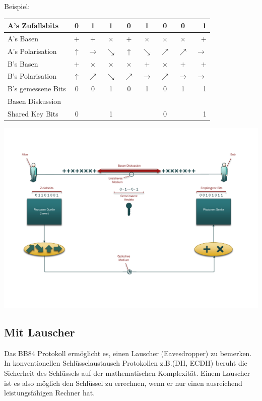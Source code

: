   Beispiel:
  \begin{center}
    \begin{tabular}{ l || c | c | c | c | c | c | c | r }
      \hline
      A's Zufallsbits & 0 &  1 & 1 & 0 & 1 & 0 & 0 & 1 \\
      \hline
      A's Basen & $+$ & $+$ & $\times $ & $+$ & $\times $ & $\times $ & $\times $ & $+$ \\
      \hline
      A's Polarisation & $\uparrow$ & $\rightarrow$ & $\searrow$ & $\uparrow$ & $\searrow$ & $\nearrow$ & $\nearrow$ & $\rightarrow$ \\
      \hline
      B's Basen & $+$ & $\times $ & $\times $ & $\times $ & $+$ & $\times $ & $+$ & $+$ \\
      \hline
      B's Polarisation & $\uparrow$ & $\nearrow$ & $\searrow$ & $\nearrow$ & $\rightarrow$ & $\nearrow$ & $\rightarrow$ & $\rightarrow$ \\
      \hline
      B's gemessene Bits & 0 & 0 & 1 & 0 & 1 & 0 & 1 & 1 \\
      \hline
      Basen Diskussion \\
      \hline
      Shared Key Bits& 0 & & 1 & & & 0 & & 1 \\
      \hline
    \end{tabular}
  \end{center}

  \includegraphics[width=\textwidth]{crypto/BB84.pdf}

  \subsection{Mit Lauscher}
  Das BB84 Protokoll erm\"oglicht es, einen Lauscher (Eavesdropper) zu bemerken.
  In konventionellen Schl\"usselaustausch Protokollen z.B.(DH, ECDH)
  beruht die Sicherheit des Schl\"ussels auf der mathematischen Komplexit\"at.
  Einem Lauscher ist es also m\"oglich den Schl\"ussel zu errechnen,
  wenn er nur einen ausreichend leistungsf\"ahigen Rechner hat.

